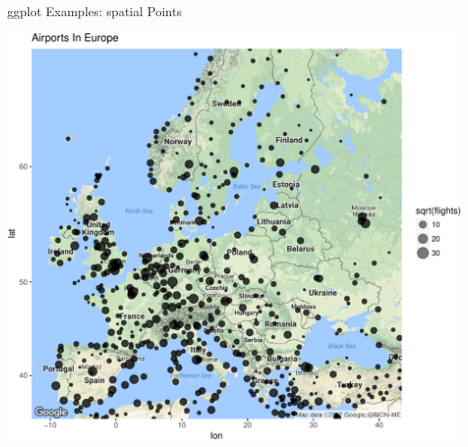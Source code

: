 \documentclass[10pt,ignorenonframetext,]{beamer}
\begin{document}
\begin{frame}{ggplot Examples: spatial Points}

\begin{center}\includegraphics[width=0.8\linewidth]{SpatialDataLecture_files/figure-beamer/unnamed-chunk-44-1} \end{center}

\end{frame}
\end{document}
